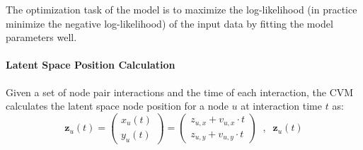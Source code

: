 The optimization task of the model is to maximize the log-likelihood (in practice minimize the negative log-likelihood) of the input data by fitting the model parameters well.

\paragraph{Latent Space Position Calculation}
Given a set of node pair interactions and the time of each interaction, the CVM calculates the latent space node position for a node $u$ at interaction time $t$ as:
\begin{equation}
    \textbf{z}_{u}(t) = 
    \begin{pmatrix}
        x_{u}(t) \\
        y_{u}(t)
    \end{pmatrix}
    =
    \begin{pmatrix}
        z_{u,x}+v_{u,x} \cdot t \\
        z_{u,y}+v_{u,y} \cdot t
    \end{pmatrix}
    \;\; , \;\; \textbf{z}_{u}(t)
    \label{eq:Method:ConstantVelocity:latent_pos}
\end{equation}

